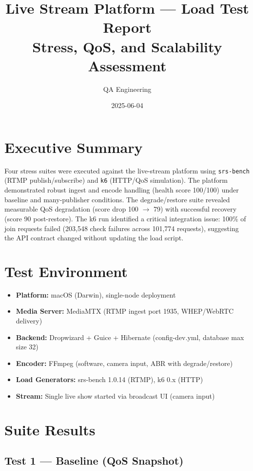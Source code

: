 \documentclass[a4paper,11pt]{article}
\title{\textbf{Live Stream Platform --- Load Test Report}\\[4pt]\large Stress, QoS, and Scalability Assessment}
\author{QA Engineering}
\date{2025-06-04}
\begin{document}
\maketitle
\thispagestyle{empty}

\section{Executive Summary}

Four stress suites were executed against the live-stream platform using \texttt{srs-bench} (RTMP publish/subscribe) and \texttt{k6} (HTTP/QoS simulation). The platform demonstrated robust ingest and encode handling (health score 100/100) under baseline and many-publisher conditions. The degrade/restore suite revealed measurable QoS degradation (score drop 100 $\rightarrow$ 79) with successful recovery (score 90 post-restore). The k6 run identified a critical integration issue: 100\% of join requests failed (203,548 check failures across 101,774 requests), suggesting the API contract changed without updating the load script.

\section{Test Environment}

\begin{itemize}
  \item \textbf{Platform:} macOS (Darwin), single-node deployment
  \item \textbf{Media Server:} MediaMTX (RTMP ingest port 1935, WHEP/WebRTC delivery)
  \item \textbf{Backend:} Dropwizard + Guice + Hibernate (config-dev.yml, database max size 32)
  \item \textbf{Encoder:} FFmpeg (software, camera input, ABR with degrade/restore)
  \item \textbf{Load Generators:} srs-bench 1.0.14 (RTMP), k6 0.x (HTTP)
  \item \textbf{Stream:} Single live show started via broadcast UI (camera input)
\end{itemize}

\section{Suite Results}

\subsection{Test 1 --- Baseline (QoS Snapshot)}
\end{document}
